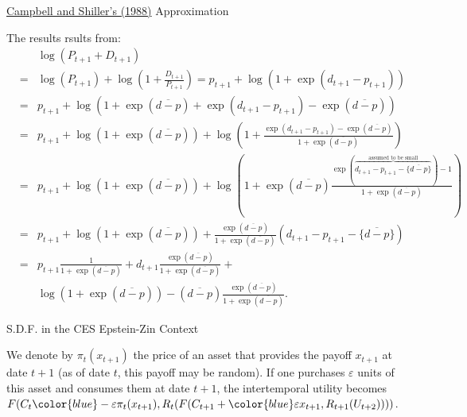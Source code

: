



{\href{http://rfs.oxfordjournals.org/content/1/3/195.short}{Campbell and Shiller's (1988)} Approximation}\label{slide:CSlinearproof}

\hyperlink{slide:CSlinear}{}



The results rsults from:
\begin{eqnarray*}
&& \log(P_{t+1}+D_{t+1})\\
&=& \log(P_{t+1}) + \log \left(1+\frac{D_{t+1}}{P_{t+1}}\right) = p_{t+1} + \log(1+\exp(d_{t+1}-p_{t+1}))\\
&=& p_{t+1} + \log\left(1+\exp(\overline{d-p}) + \exp(d_{t+1}-p_{t+1}) - \exp(\overline{d-p})\right)\\
&=& p_{t+1} + \log(1+\exp(\overline{d-p})) + \log\left(1+\frac{\exp(d_{t+1}-p_{t+1}) -\exp(\overline{d-p})}{1+\exp(\overline{d-p})}\right)\\
&=& p_{t+1} + \log(1+\exp(\overline{d-p})) + \log\left(1+\exp(\overline{d-p})\frac{\exp(\overbrace{d_{t+1}-p_{t+1}- \{\overline{d-p}\}}^{\mbox{assumed to be small}}) -1}{1+\exp(\overline{d-p})}\right)\\
&=& p_{t+1} + \log(1+\exp(\overline{d-p})) + \frac{\exp(\overline{d-p})}{{1+\exp(\overline{d-p})}} \left(d_{t+1}-p_{t+1}- \{\overline{d-p}\}\right)\\
&=& p_{t+1} \frac{1}{1+\exp(\overline{d-p})} + d_{t+1} \frac{\exp(\overline{d-p})}{{1+\exp(\overline{d-p})}} +\\
&& \log(1+\exp(\overline{d-p})) - \left(\overline{d-p}\right) \frac{\exp(\overline{d-p})}{{1+\exp(\overline{d-p})}}.
\end{eqnarray*}



{S.D.F. in the CES Epstein-Zin Context}\label{slide:sdf_appendix}

We denote by $\pi_t(x_{t+1})$ the price of an asset that provides the payoff $x_{t+1}$ at date $t+1$ (as of date $t$, this payoff may be random). If one purchases $\varepsilon$ units of this asset and consumes them at date $t+1$, the intertemporal utility becomes $F(C_t{\color{blue} - \varepsilon \pi_t(x_{t+1})},R_t(F(C_{t+1}+{\color{blue}\varepsilon x_{t+1}},R_{t+1}(U_{t+2}))))$.

